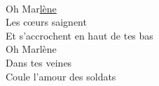 \\
Oh Mar\underline{lène}\\
Les cœurs saignent\\
Et s'accrochent en haut de tes bas\\
Oh Marlène\\
Dans tes veines\\
Coule l'amour des soldats\\
